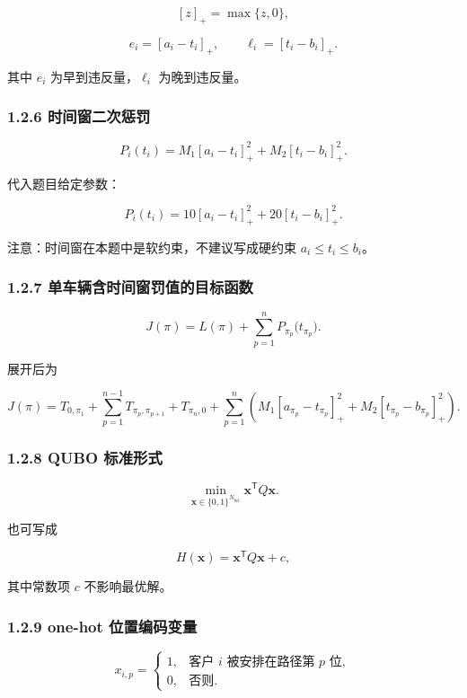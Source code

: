 \documentclass[
  a4paper,
]{ctexart}
\begin{document}
\[
[z]_+=\max\{z,0\},
\]

\[
e_i=[a_i-t_i]_+,
\qquad
\ell_i=[t_i-b_i]_+.
\]

其中 \(e_i\) 为早到违反量，\(\ell_i\) 为晚到违反量。

\subsubsection{1.2.6
时间窗二次惩罚}\label{ux65f6ux95f4ux7a97ux4e8cux6b21ux60e9ux7f5a}

\[
P_i(t_i)=M_1[a_i-t_i]_+^2+M_2[t_i-b_i]_+^2.
\]

代入题目给定参数：

\[
P_i(t_i)=10[a_i-t_i]_+^2+20[t_i-b_i]_+^2.
\]

注意：时间窗在本题中是软约束，不建议写成硬约束 \(a_i\le t_i\le b_i\)。

\subsubsection{1.2.7
单车辆含时间窗罚值的目标函数}\label{ux5355ux8f66ux8f86ux542bux65f6ux95f4ux7a97ux7f5aux503cux7684ux76eeux6807ux51fdux6570}

\[
J(\pi)=L(\pi)+\sum_{p=1}^{n}P_{\pi_p}\bigl(t_{\pi_p}\bigr).
\]

展开后为

\[
J(\pi)=T_{0,\pi_1}+\sum_{p=1}^{n-1}T_{\pi_p,\pi_{p+1}}+T_{\pi_n,0}
+\sum_{p=1}^{n}\left(M_1[a_{\pi_p}-t_{\pi_p}]_+^2+M_2[t_{\pi_p}-b_{\pi_p}]_+^2\right).
\]

\subsubsection{1.2.8 QUBO 标准形式}\label{qubo-ux6807ux51c6ux5f62ux5f0f}

\[
\min_{\mathbf{x}\in\{0,1\}^{N_{\mathrm{bit}}}}\mathbf{x}^{\mathsf T}Q\mathbf{x}.
\]

也可写成

\[
H(\mathbf{x})=\mathbf{x}^{\mathsf T}Q\mathbf{x}+c,
\]

其中常数项 \(c\) 不影响最优解。

\subsubsection{1.2.9 one-hot
位置编码变量}\label{one-hot-ux4f4dux7f6eux7f16ux7801ux53d8ux91cf}

\[
x_{i,p}=\begin{cases}
1, & \text{客户 }i\text{ 被安排在路径第 }p\text{ 位},\\
0, & \text{否则}.
\end{cases}
\]
\end{document}
